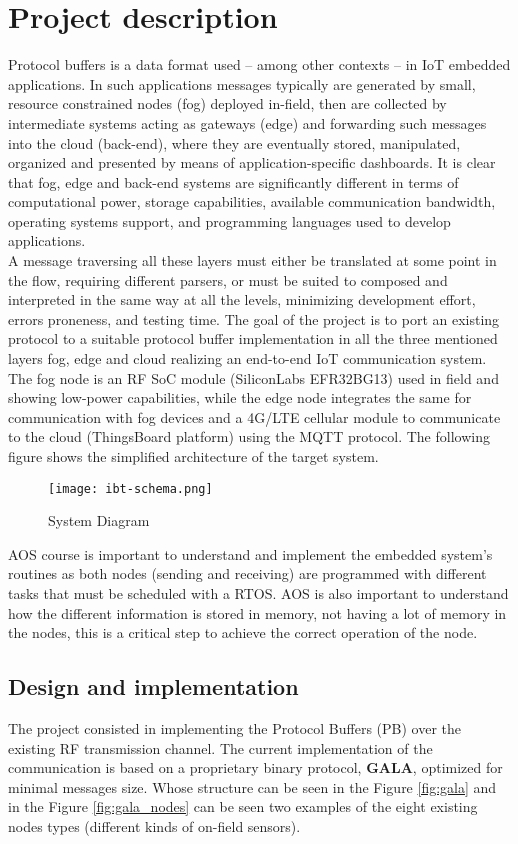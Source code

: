 \documentclass[10pt,a4]{article}
\begin{document}
\section{Project description}

Protocol buffers is a data format used – among other contexts – in IoT embedded applications. In such applications messages typically are generated by small, resource constrained nodes (fog) deployed in-field, then are collected by intermediate systems acting as gateways (edge) and forwarding such messages into the cloud (back-end), where they are eventually stored, manipulated, organized and presented by means of application-specific dashboards. It is clear that fog, edge and back-end systems are significantly different in terms of computational power, storage capabilities, available communication bandwidth, operating systems support, and programming languages used to develop applications.
\\
A message traversing all these layers must either be translated at some point in the flow, requiring different parsers, or must be suited to composed and interpreted in the same way at all the levels, minimizing development effort, errors proneness, and testing time. The goal of the project is to port an existing protocol to a suitable protocol buffer implementation in all the three mentioned layers fog, edge and cloud realizing an end-to-end IoT communication system.
The fog node is an RF SoC module (SiliconLabs EFR32BG13) used in field and showing low-power capabilities, while the edge node integrates the same for communication with fog devices and a 4G/LTE cellular module to communicate to the cloud (ThingsBoard platform) using the MQTT protocol. The following figure shows the simplified architecture of the target system.
\begin{figure}[ht]
    \centering
    \texttt{[image: ibt-schema.png]}
    \caption{System Diagram}
\end{figure}

AOS course is important to understand and implement the embedded system's routines as both nodes (sending and receiving) are programmed with different tasks that must be scheduled with a RTOS. AOS is also important to understand how the different information is stored in memory, not having a lot of memory in the nodes, this is a critical step to achieve the correct operation of the node.


\subsection{Design and implementation}
The project consisted in implementing the Protocol Buffers (PB) over the existing RF transmission channel. The current implementation of the communication is based on a proprietary binary protocol, \textbf{GALA}, optimized for minimal messages size. Whose structure can be seen in the Figure \ref{fig:gala} and in the Figure \ref{fig:gala_nodes} can be seen two examples of the eight existing nodes types (different kinds of on-field sensors).\\
\end{document}
